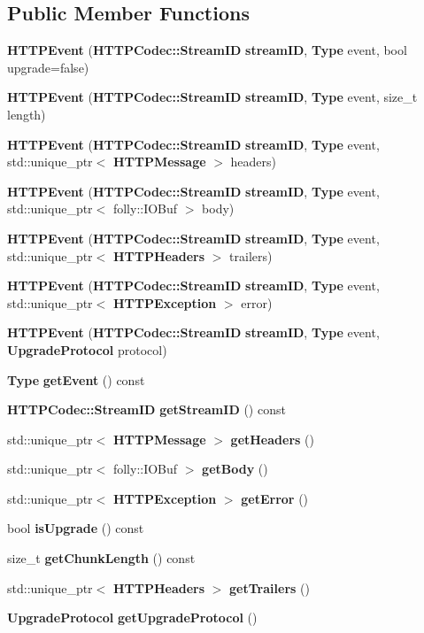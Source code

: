 \subsection*{Public Member Functions}
\begin{DoxyCompactItemize}
\item 
{\bf H\+T\+T\+P\+Event} ({\bf H\+T\+T\+P\+Codec\+::\+Stream\+ID} {\bf stream\+ID}, {\bf Type} event, bool upgrade=false)
\item 
{\bf H\+T\+T\+P\+Event} ({\bf H\+T\+T\+P\+Codec\+::\+Stream\+ID} {\bf stream\+ID}, {\bf Type} event, size\+\_\+t length)
\item 
{\bf H\+T\+T\+P\+Event} ({\bf H\+T\+T\+P\+Codec\+::\+Stream\+ID} {\bf stream\+ID}, {\bf Type} event, std\+::unique\+\_\+ptr$<$ {\bf H\+T\+T\+P\+Message} $>$ headers)
\item 
{\bf H\+T\+T\+P\+Event} ({\bf H\+T\+T\+P\+Codec\+::\+Stream\+ID} {\bf stream\+ID}, {\bf Type} event, std\+::unique\+\_\+ptr$<$ folly\+::\+I\+O\+Buf $>$ body)
\item 
{\bf H\+T\+T\+P\+Event} ({\bf H\+T\+T\+P\+Codec\+::\+Stream\+ID} {\bf stream\+ID}, {\bf Type} event, std\+::unique\+\_\+ptr$<$ {\bf H\+T\+T\+P\+Headers} $>$ trailers)
\item 
{\bf H\+T\+T\+P\+Event} ({\bf H\+T\+T\+P\+Codec\+::\+Stream\+ID} {\bf stream\+ID}, {\bf Type} event, std\+::unique\+\_\+ptr$<$ {\bf H\+T\+T\+P\+Exception} $>$ error)
\item 
{\bf H\+T\+T\+P\+Event} ({\bf H\+T\+T\+P\+Codec\+::\+Stream\+ID} {\bf stream\+ID}, {\bf Type} event, {\bf Upgrade\+Protocol} protocol)
\item 
{\bf Type} {\bf get\+Event} () const 
\item 
{\bf H\+T\+T\+P\+Codec\+::\+Stream\+ID} {\bf get\+Stream\+ID} () const 
\item 
std\+::unique\+\_\+ptr$<$ {\bf H\+T\+T\+P\+Message} $>$ {\bf get\+Headers} ()
\item 
std\+::unique\+\_\+ptr$<$ folly\+::\+I\+O\+Buf $>$ {\bf get\+Body} ()
\item 
std\+::unique\+\_\+ptr$<$ {\bf H\+T\+T\+P\+Exception} $>$ {\bf get\+Error} ()
\item 
bool {\bf is\+Upgrade} () const 
\item 
size\+\_\+t {\bf get\+Chunk\+Length} () const 
\item 
std\+::unique\+\_\+ptr$<$ {\bf H\+T\+T\+P\+Headers} $>$ {\bf get\+Trailers} ()
\item 
{\bf Upgrade\+Protocol} {\bf get\+Upgrade\+Protocol} ()
\end{DoxyCompactItemize}
